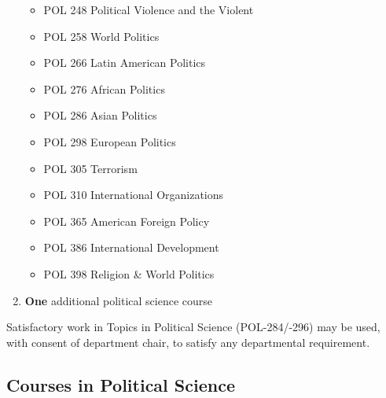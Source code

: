 \documentclass[
  letterpaper,
]{scrbook}
\providecommand{\tightlist}{%
  \setlength{\itemsep}{0pt}\setlength{\parskip}{0pt}}
\begin{document}
\begin{enumerate}
  \begin{itemize}
  \tightlist
  \item
    POL 248 Political Violence and the Violent
  \item
    POL 258 World Politics
  \item
    POL 266 Latin American Politics
  \item
    POL 276 African Politics
  \item
    POL 286 Asian Politics
  \item
    POL 298 European Politics
  \item
    POL 305 Terrorism
  \item
    POL 310 International Organizations
  \item
    POL 365 American Foreign Policy
  \item
    POL 386 International Development
  \item
    POL 398 Religion \& World Politics
  \end{itemize}
\item
  \textbf{One} additional political science course
\end{enumerate}

Satisfactory work in Topics in Political Science (POL-284/-296) may be
used, with consent of department chair, to satisfy any departmental
requirement.

\subsection{Courses in Political
Science}\label{courses-in-political-science}
\end{document}
